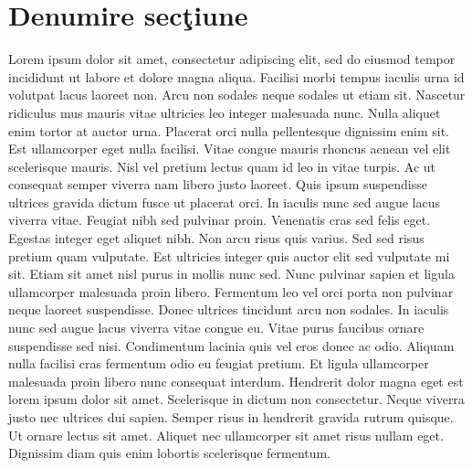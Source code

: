 \section{Denumire sec\c{t}iune}
Lorem ipsum dolor sit amet, consectetur adipiscing elit, sed do eiusmod tempor incididunt ut labore et dolore magna aliqua. Facilisi morbi tempus iaculis urna id volutpat lacus laoreet non. Arcu non sodales neque sodales ut etiam sit. Nascetur ridiculus mus mauris vitae ultricies leo integer malesuada nunc. Nulla aliquet enim tortor at auctor urna. Placerat orci nulla pellentesque dignissim enim sit. Est ullamcorper eget nulla facilisi. Vitae congue mauris rhoncus aenean vel elit scelerisque mauris. Nisl vel pretium lectus quam id leo in vitae turpis. Ac ut consequat semper viverra nam libero justo laoreet. Quis ipsum suspendisse ultrices gravida dictum fusce ut placerat orci. In iaculis nunc sed augue lacus viverra vitae. Feugiat nibh sed pulvinar proin. Venenatis cras sed felis eget. Egestas integer eget aliquet nibh. Non arcu risus quis varius. Sed sed risus pretium quam vulputate.
Est ultricies integer quis auctor elit sed vulputate mi sit. Etiam sit amet nisl purus in mollis nunc sed. Nunc pulvinar sapien et ligula ullamcorper malesuada proin libero. Fermentum leo vel orci porta non pulvinar neque laoreet suspendisse. Donec ultrices tincidunt arcu non sodales. In iaculis nunc sed augue lacus viverra vitae congue eu. Vitae purus faucibus ornare suspendisse sed nisi. Condimentum lacinia quis vel eros donec ac odio. Aliquam nulla facilisi cras fermentum odio eu feugiat pretium. Et ligula ullamcorper malesuada proin libero nunc consequat interdum. Hendrerit dolor magna eget est lorem ipsum dolor sit amet. Scelerisque in dictum non consectetur. Neque viverra justo nec ultrices dui sapien. Semper risus in hendrerit gravida rutrum quisque. Ut ornare lectus sit amet. Aliquet nec ullamcorper sit amet risus nullam eget. Dignissim diam quis enim lobortis scelerisque fermentum.

